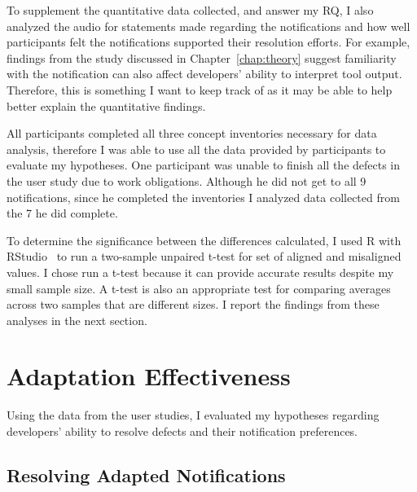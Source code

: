 To supplement the quantitative data collected, and answer my RQ, I also analyzed the audio for statements made regarding the notifications and how well participants felt the notifications supported their resolution efforts.
For example, findings from the study discussed in Chapter~\ref{chap:theory} suggest familiarity with the notification can also affect developers' ability to interpret tool output. Therefore, this is something I want to keep track of as it may be able to help better explain the quantitative findings.

All participants completed all three concept inventories necessary for data analysis, therefore I was able to use all the data provided by participants to evaluate my hypotheses.
One participant was unable to finish all the defects in the user study due to work obligations. Although he did not get to all 9 notifications, since he completed the inventories I analyzed data collected from the 7 he did complete.

To determine the significance between the differences calculated, I used R with RStudio~\cite{RSoftware} to run a two-sample unpaired t-test for set of aligned and misaligned values. I chose run a t-test because it can provide accurate results despite my small sample size. A t-test is also an  appropriate test for comparing averages across two samples that are different sizes.
I report the findings from these analyses in the next section.

\section{Adaptation Effectiveness}
Using the data from the user studies, I evaluated my hypotheses regarding developers' ability to resolve defects and their notification preferences.

\subsection{Resolving Adapted Notifications}



